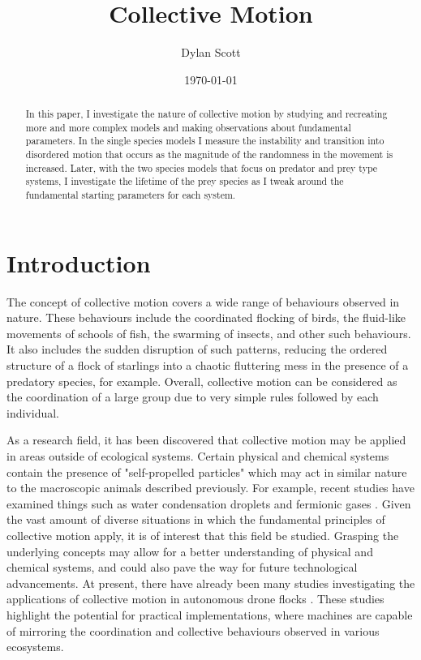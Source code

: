\documentclass[%
11pt,
amsmath, amssymb,
aps,
pra
]{revtex4-2}
\begin{document}
\title{Collective Motion}
\author{Dylan Scott}
\date{\today}


\begin{abstract}
In this paper, I investigate the nature of collective motion by studying and recreating more and more complex models
and making observations about fundamental parameters. In the single species models I measure the instability and transition
into disordered motion that occurs as the magnitude of the randomness in the movement is increased. Later, with the two species
models that focus on predator and prey type systems, I investigate the lifetime of the prey species as I tweak around the fundamental
starting parameters for each system. 
\end{abstract}

\maketitle


\tableofcontents
\section{Introduction}
The concept of collective motion covers a wide range of behaviours observed in nature. 
These behaviours include the coordinated flocking of birds, the fluid-like movements of schools of fish, 
the swarming of insects, and other such behaviours. It also includes the sudden disruption of such patterns, reducing
the ordered structure of a flock of starlings into a chaotic fluttering mess in the presence of a predatory species, for example.
Overall, collective motion can be considered as the coordination of a large group due to very simple rules followed
by each individual. 

As a research field, it has been discovered that collective motion may be applied in areas outside of 
ecological systems. Certain physical and chemical systems contain the presence of "self-propelled particles" which may
act in similar nature to the macroscopic animals described previously. For example, recent studies have examined 
things such as water condensation droplets \cite{lin2023emergent} and fermionic gases \cite{wang2023viscous}.
Given the vast amount of diverse situations in which the fundamental principles of collective motion apply, 
it is of interest that this field be studied. Grasping the underlying concepts may allow for a better understanding
of physical and chemical systems, and could also pave the way for future technological advancements. At present, there
have already been many studies investigating the applications of collective motion in autonomous drone flocks
\cite{verdoucq2022bio,zhao2018self,albani2022distributed}. These studies highlight the potential for practical 
implementations, where machines are capable of mirroring the coordination and collective behaviours observed in various
ecosystems.
\end{document}
